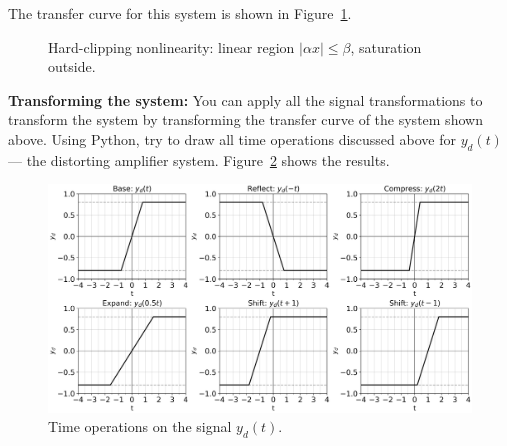 \documentclass{ee102_notes}
\begin{document}
The transfer curve for this system is shown in Figure~\ref{fig:sys_clip}. 
\begin{figure}[h]
\centering
{}
\caption{Hard-clipping nonlinearity: linear region $|\alpha x|\le \beta$, saturation outside.}
\label{fig:sys_clip}
\end{figure}

\textbf{Transforming the system:} You can apply all the signal transformations to transform the system by transforming the transfer curve of the system shown above. Using Python, try to draw all time operations discussed above for $y_d(t)$ --- the distorting amplifier system. Figure~\ref{fig:week2_clipping} shows the results.
\begin{figure}
    \centering
    \includegraphics[width=\linewidth]{figs/clip_ops_grid.png}
    \caption{Time operations on the signal $y_d(t)$.}
    \label{fig:week2_clipping}
\end{figure}
\end{document}

